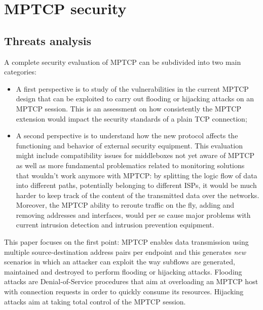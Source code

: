 \chapter{MPTCP security}
\label{chap:mptcpsecurity}

\section{Threats analysis}
A complete security evaluation of MPTCP can be subdivided into two main categories:

\begin{itemize}
  \item A first perspective is to study of the vulnerabilities in the current MPTCP design that can be exploited to carry out flooding or hijacking attacks on an MPTCP session. This is an assessment on how consistently the MPTCP extension would impact the security standards of a plain TCP connection;
  \item A second perspective is to understand how the new protocol affects the functioning and behavior of external security equipment. This evaluation might include compatibility issues for middleboxes not yet aware of MPTCP as well as more fundamental problematics related to monitoring solutions that wouldn't work anymore with MPTCP: by splitting the logic flow of data into different paths, potentially belonging to different ISPs, it would be much harder to keep track of the content of the transmitted data over the networks. Moreover, the MPTCP ability to reroute traffic on the fly, adding and removing addresses and interfaces, would per se cause major problems with current intrusion detection and intrusion prevention equipment.
\end{itemize}

This paper focuses on the first point: MPTCP enables data transmission using multiple source-destination address pairs per endpoint and this generates \textit{new} scenarios in which an attacker can exploit the way subflows are generated, maintained and destroyed to perform flooding or hijacking attacks. 
Flooding attacks are Denial-of-Service procedures that aim at overloading an MPTCP host with connection requests in order to quickly consume its resources.
Hijacking attacks aim at taking total control of the MPTCP session.

